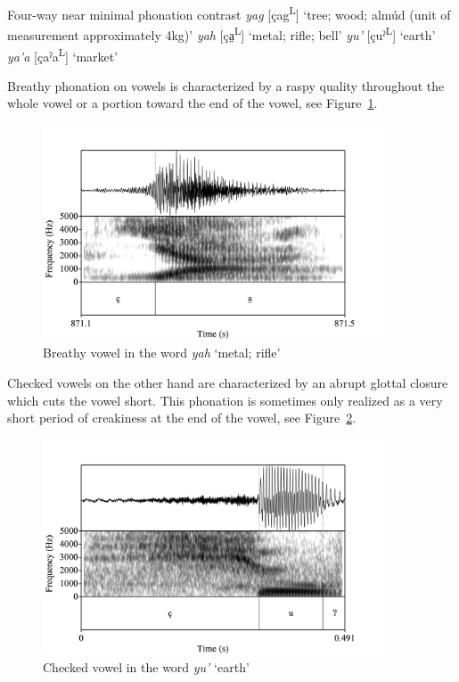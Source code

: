 \documentclass[12pt, letterpaper]{article}
\newcommand{\supr}[1]{\textsuperscript{#1}}
\begin{document}
\ea \label{ex:YA} Four-way near minimal phonation contrast
	\ea \textit{yag}  [çag\supr{L}] `tree; wood; almúd (unit of measurement approximately 4kg)'
	\ex \textit{yah}  [ça̤\supr{L}] `metal; rifle; bell'
	\ex \textit{yu'}  [çuˀ\supr{L}]  `earth'
	\ex \textit{ya'a}  [çaˀa\supr{L}]  `market'
	\z 
\z 

Breathy phonation on vowels is characterized by a raspy quality throughout the whole vowel or a portion toward the end of the vowel, see Figure~\ref{fig:BreathyVowel}. 

\begin{figure}[!h]
	\centering
	\includegraphics[width=0.9\textwidth]{../yah.png}
	\caption{Breathy vowel in the word \textit{yah} `metal; rifle'}
	\label{fig:BreathyVowel}
\end{figure}

Checked vowels on the other hand are characterized by an abrupt glottal closure which cuts the vowel short. This phonation is sometimes only realized as a very short period of creakiness at the end of the vowel, see Figure~\ref{fig:CheckedVowel}.  

\begin{figure}[!h]
	\centering
	\includegraphics[width=0.9\textwidth]{RD_yu'.png}
	\caption{Checked vowel in the word \textit{yu'} `earth'}
	\label{fig:CheckedVowel}
\end{figure}
\end{document}
